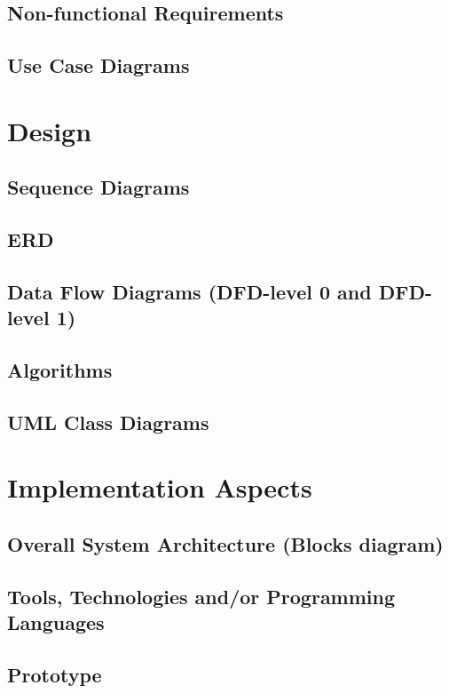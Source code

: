 \documentclass{article}
\begin{document}
		\subsection{Non-functional Requirements}
		
		\subsection{Use Case Diagrams}
	
	\section{Design}
		\subsection{Sequence Diagrams}
		
		\subsection{ERD}
		
		\subsection{Data Flow Diagrams (DFD-level 0 and DFD-level 1)}
		
		\subsection{Algorithms}
		
		\subsection{UML Class Diagrams}
	
	\section{Implementation Aspects}
		\subsection{Overall System Architecture (Blocks diagram)}
		
		\subsection{Tools, Technologies and/or Programming Languages}
		
		\subsection{Prototype}
	
\end{document}
